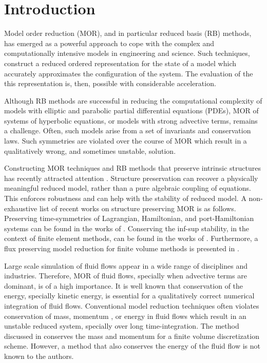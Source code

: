 \section{Introduction} \label{sec:intro}

Model order reduction (MOR), and in particular reduced basis (RB) methods, has emerged as a powerful approach to cope with the complex and computationally intensive models in engineering and science. Such techniques, construct a reduced ordered representation for the state of a model which accurately approximates the configuration of the system. The evaluation of the this representation is, then, possible with considerable acceleration.

Although RB methods are successful in reducing the computational complexity of models with elliptic and parabolic partial differential equations (PDEs), MOR of systems of hyperbolic equations, or models with strong advective terms, remains a challenge. Often, such models arise from a set of invariants and conservation laws. Such symmetries are violated over the course of MOR which result in a qualitatively wrong, and sometimes unstable, solution.

Constructing MOR techniques and RB methods that preserve intrinsic structures has recently attracted attention \cite{doi:10.1137/17M1111991,1705.00498,kalashnikova2014stabilization,farhat2015structure,doi:10.1137/110836742,beattie2011structure,doi:10.1137/140978922}. Structure preservation can recover a physically meaningful reduced model, rather than a pure algebraic coupling of equations. This enforces robustness and can help with the stability of reduced model. A non-exhaustive list of recent works on structure preserving MOR is as follows. Preserving time-symmetries of Lagrangian, Hamiltonian, and port-Hamiltonian systems can be found in the works of \cite{Carlberg:2014ky,doi:10.1137/140978922,doi:10.1137/17M1111991,1705.00498,beattie2011structure,chaturantabut2016structure,gugercin2012structure}. Conserving the inf-sup stability, in the context of finite element methods, can be found in the works of \cite{farhat2015structure,ballarin2015supremizer}. Furthermore, a flux preserving model reduction for finite volume methods is presented in \cite{carlberg2018conservative}. 

Large scale simulation of fluid flows appear in a wide range of disciplines and industries. Therefore, MOR of fluid flows, specially when advective terms are dominant, is of a high importance. It is well known that conservation of the energy, specially kinetic energy, is essential for a qualitatively correct numerical integration of fluid flows. Conventional model reduction techniques often violates conservation of mass, momentum \cite{carlberg2018conservative}, or energy in fluid flows which result in an unstable reduced system, specially over long time-integration. The method discussed in \cite{carlberg2018conservative} conserves the mass and momentum for a finite volume discretization scheme. However, a method that also conserves the energy of the fluid flow is not known to the authors.

